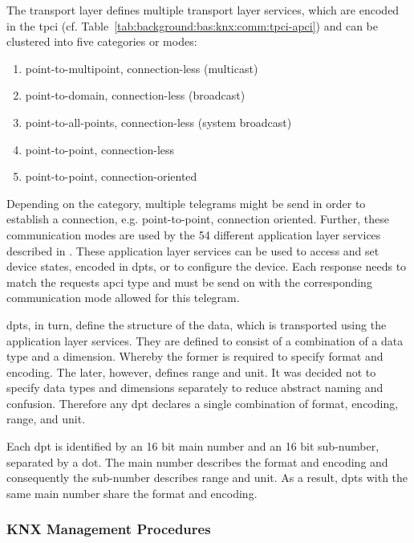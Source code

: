 The transport layer defines multiple transport layer services, which are encoded in the \gls{tpci} (cf. Table~\ref{tab:background:bas:knx:comm:tpci-apci}) and can be clustered into five categories or modes:

\begin{enumerate}
	\item point-to-multipoint, connection-less (multicast)
	\item point-to-domain, connection-less (broadcast)
	\item point-to-all-points, connection-less (system broadcast)
	\item point-to-point, connection-less
	\item point-to-point, connection-oriented
\end{enumerate}
\parencite[p.~30]{DIN_EN_50090-4-2}

Depending on the category, multiple telegrams might be send in order to establish a connection, e.g. point-to-point, connection oriented.
Further, these communication modes are used by the \alert{54} different application layer services described in \textcite{DIN_EN_50090-4-1}.
These application layer services can be used to access and set device states, encoded in \glspl{dpt}, or to configure the device.
Each response needs to match the requests \gls{apci} type and must be send on with the corresponding communication mode allowed for this telegram. \parencite[pp.~9--10]{DIN_EN_50090-4-1}

\glspl{dpt}, in turn, define the structure of the data, which is transported using the application layer services.
They are defined to consist of a combination of a data type and a dimension. Whereby the former is required to specify format and encoding. The later, however, defines range and unit.
It was decided not to specify data types and dimensions separately to reduce abstract naming and confusion.
Therefore any \gls{dpt} declares a single combination of format, encoding, range, and unit. \parencite[p.~38]{DIN_EN_50090-3-3}

Each \gls{dpt} is identified by an 16 bit main number and an 16 bit sub-number, separated by a dot. The main number describes the format and encoding and consequently the sub-number describes range and unit. As a result, \glspl{dpt} with the same main number share the format and encoding.


	
\subsubsection{KNX Management Procedures}
\label{sec:background:bas:knx:management}

